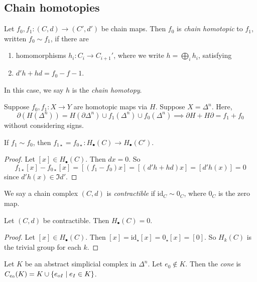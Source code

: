\subsection{Chain homotopies}
\begin{definition}
	Let \( f_0, f_1 \colon (C, d) \to (C', d') \) be chain maps.
	Then \( f_0 \) is \emph{chain homotopic} to \( f_1 \), written \( f_0 \sim f_1 \), if there are
	\begin{enumerate}
		\item homomorphisms \( h_i \colon C_i \to C_{i+1}' \), where we write \( h = \bigoplus_i h_i \), satisfying
		\item \( d'h + hd = f_0 - f-1 \).
	\end{enumerate}
	In this case, we say \( h \) is the \emph{chain homotopy}.
\end{definition}
\begin{example}
	Suppose \( f_0, f_1 \colon X \to Y \) are homotopic maps via \( H \).
	Suppose \( X = \Delta^n \).
	Here,
	\[ \partial(H(\Delta^n)) = H(\partial\Delta^n) \cup f_1(\Delta^n) \cup f_0(\Delta^n) \implies \partial H + H \partial = f_1 + f_0 \]
	without considering signs.
\end{example}
\begin{lemma}
	If \( f_1 \sim f_0 \), then \( f_{1\star} = f_{0\star} \colon H_\bullet(C) \to H_\bullet(C') \).
\end{lemma}
\begin{proof}
	Let \( [x] \in H_\bullet(C) \).
	Then \( dx = 0 \).
	So
	\[ f_{1\star}[x] - f_{0\star}[x] = [(f_1 - f_0)x] = [(d'h + hd)x] = [d'h(x)] = 0 \]
	since \( d'h(x) \in \Im d' \).
\end{proof}
\begin{definition}
	We say a chain complex \( (C, d) \) is \emph{contractible} if \( \mathrm{id}_C \sim 0_C \), where \( 0_C \) is the zero map.
\end{definition}
\begin{lemma}
	Let \( (C, d) \) be contractible.
	Then \( H_\bullet(C) = 0 \).
\end{lemma}
\begin{proof}
	Let \( [x] \in H_\bullet(C) \).
	Then \( [x] = \mathrm{id}_\star[x] = 0_\star[x] = [0] \).
	So \( H_k(C) \) is the trivial group for each \( k \).
\end{proof}
\begin{definition}
	Let \( K \) be an abstract simplicial complex in \( \Delta^n \).
	Let \( e_0 \not\in K \).
	Then the \emph{cone} is \( C_{e_0}(K) = K \cup \qty{e_{oI} \mid e_I \in K} \).
\end{definition}
